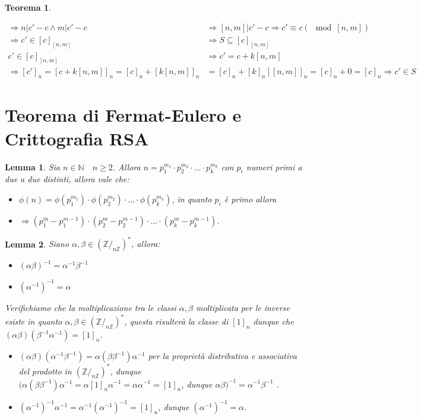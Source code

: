 \documentclass{article}
\makeatletter
\renewenvironment{proof}[1][\proofname]{\par
    \pushQED{\qed}%
    \normalfont \topsep6\p@\@plus6\p@\relax
    \trivlist
    \item\relax
    {\itshape
    #1\@addpunct{.}}\hspace\labelsep\ignorespaces
    }{%
    \popQED\endtrivlist\@endpefalse
}
\newtheorem{theorem}{Teorema}[part]
\newtheorem{lemma}{Lemma}[theorem]
\theoremstyle{definition}
\newcommand{\Z}{\mathbb{Z}}
\newcommand{\N}{\mathbb{N}}
\makeatother
\begin{document}
\begin{theorem}
\begin{proof}
\[\begin{aligned}
                \Rightarrow n|c'-c \land m|c'-c & \Rightarrow [n,m]|c'-c \Rightarrow c'\equiv c(\mod [n,m])\\
                \Rightarrow c'\in [c]_{[n,m]} &\Rightarrow S\subseteq [c]_{[n,m]}\\
                c'\in[c]_{[n,m]} &\Rightarrow c'=c+k[n,m]\\
                \Rightarrow [c']_n = [c+k[n,m]]_n = [c]_n + [k[n,m]]_n &= [c]_n + [k]_n[[n,m]]_n = [c]_n + 0 = [c]_n\Rightarrow c'\in S
            \end{aligned}
        \]
    \pushQED{}
    \end{proof}
    \raggedleft{{\ensuremath{\blacksquare}}}
\end{theorem}
\part{Teorema di Fermat-Eulero e Crittografia RSA}
\begin{lemma}
    Sia \(n\in\N\quad n\geq 2\).
    Allora \(n=p_1^{m_1}\cdot p_2^{m_2}\cdot\ldots\cdot p_k^{m_k}\) con \(p_i\) numeri primi a due a due distinti, allora vale che:
    \begin{itemize} 
        \item \(\phi(n)=\phi(p_1^{m_1})\cdot\phi(p_2^{m_2})\cdot\ldots\cdot\phi(p_k^{m_k})\), in quanto \(p_i\) è primo allora 
        \item \(\Rightarrow(p_1^{m}-p_1^{m-1})\cdot(p_2^{m}-p_2^{m-1})\cdot\ldots\cdot(p_k^{m}-p_k^{m-1})\). 
    \end{itemize}
\end{lemma}
\begin{lemma}
    Siano \(\alpha,\beta\in(\Z/_{n\Z})^*\), allora:
    \begin{itemize}
        \item \((\alpha\beta)^{-1}=\alpha^{-1}\beta^{-1}\)
        \item \((\alpha^{-1})^{-1}=\alpha\)
    \end{itemize}
    \begin{proof}
        Verifichiamo che la moltiplicazione tra le classi \(\alpha,\beta\) moltiplicata per le inverse esiste in quanto \(\alpha,\beta\in(\Z/_{n\Z})^*\), questa risulterà la classe di \([1]_n\) dunque che \((\alpha\beta)(\beta^{-1}\alpha^{-1})=[1]_n\).
        \begin{itemize}
            \item \((\alpha\beta)(\alpha^{-1}\beta^{-1})=\alpha(\beta\beta^{-1})\alpha^{-1}\) per la proprietà distributiva e associativa del prodotto in \((\Z/_{n\Z})^*\), dunque \((\alpha(\beta\beta^{-1})\alpha^{-1}=\alpha[1]_n\alpha^{-1}=\alpha\alpha^{-1}=[1]_n\), dunque \(\alpha\beta)^{-1}=\alpha^{-1}\beta^{-1}\) \checkmark.
            \item \((\alpha^{-1})^{-1}\alpha^{-1}=\alpha^{-1}(\alpha^{-1})^{-1}=[1]_n\), dunque \((\alpha^{-1})^{-1}=\alpha\).
        \end{itemize}
    \end{proof}
\end{lemma}
\end{document}
